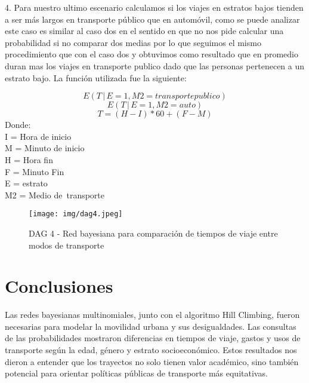 \documentclass{ajceam-class}   %
\begin{document}
4.	Para nuestro ultimo escenario calculamos si los viajes en estratos bajos tienden a ser más largos en transporte público que en automóvil, como se puede analizar este caso es similar al caso dos en el sentido en que no nos pide calcular una probabilidad si no comparar dos medias por lo que seguimos el mismo procedimiento que con el caso dos y obtuvimos como resultado que en promedio duran mas los viajes en transporte publico dado que las personas pertenecen a un estrato bajo. La función utilizada fue la siguiente:

$$E(T \,|\, E = 1, M2 = transporte publico)$$
$$E(T \,|\, E = 1, M2 = auto)$$
$$T = (H - I) * 60 + (F - M)$$
Donde:\\
I = Hora de inicio\\
M = Minuto de inicio\\
H = Hora fin\\
F = Minuto Fin\\
E = estrato\\
M2 = Medio de transporte\\

\begin{figure}[h]
\centering
\texttt{[image: img/dag4.jpeg]}
\caption{DAG 4 - Red bayesiana para comparación de tiempos de viaje entre modos de transporte}
\label{fig:dag4}
\end{figure}

\section{Conclusiones}

Las redes bayesianas multinomiales, junto con el algoritmo Hill Climbing, fueron necesarias para modelar la movilidad urbana y sus desigualdades. Las consultas de las probabilidades mostraron diferencias en tiempos de viaje, gastos y usos de transporte según la edad, género y estrato socioeconómico. Estos resultados nos dieron a entender que los trayectos no solo tienen valor académico, sino también potencial para orientar políticas públicas de transporte más equitativas.



\end{document}
